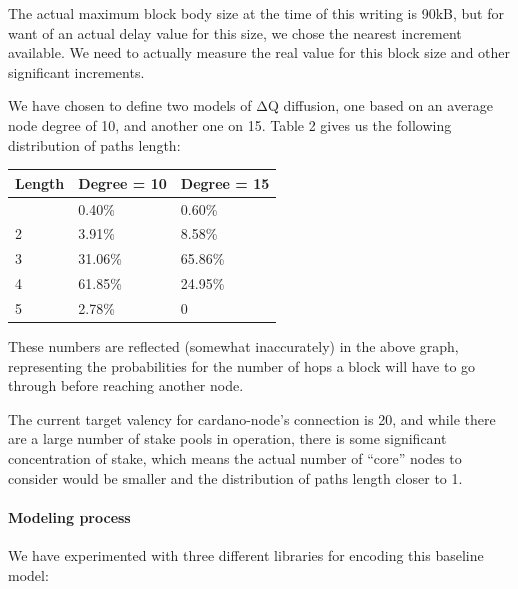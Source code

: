 \documentclass[10pt]{article}
\begin{document}
\begin{quoting}
The actual maximum block body size at the time of this
writing is 90kB, but for want of an actual delay value for this size, we
chose the nearest increment available. We need to actually measure the
real value for this block size and other significant increments.
\end{quoting}

We have chosen to define two models of ΔQ diffusion, one based on an
average node degree of 10, and another one on 15. Table 2 gives us the
following distribution of paths length:

\begin{longtable}[]{@{}lll@{}}
\toprule\noalign{}
Length & Degree = 10 & Degree = 15 \\
\midrule\noalign{}
\endhead
\bottomrule\noalign{}
\endlastfoot
1 & 0.40\% & 0.60\% \\
2 & 3.91\% & 8.58\% \\
3 & 31.06\% & 65.86\% \\
4 & 61.85\% & 24.95\% \\
5 & 2.78\% & 0 \\
\end{longtable}

These numbers are reflected (somewhat inaccurately) in the above graph,
representing the probabilities for the number of hops a block will have
to go through before reaching another node.

\begin{quoting}
The current target valency for cardano-node's connection is
20, and while there are a large number of stake pools in operation,
there is some significant concentration of stake, which means the actual
number of ``core'' nodes to consider would be smaller and the
distribution of paths length closer to 1.
\end{quoting}

\paragraph{Modeling process}\label{modeling-process}

We have experimented with three different libraries for encoding this
baseline model:
\end{document}
